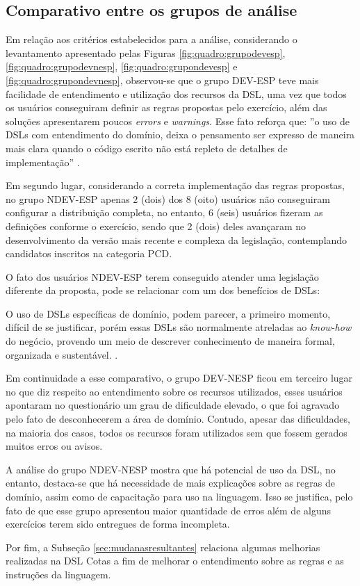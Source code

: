 \subsection{Comparativo entre os grupos de análise}
\label{sec:comparativogrupos}

Em relação aos critérios estabelecidos para a análise, considerando o levantamento apresentado pelas Figuras \ref{fig:quadro:grupodevesp}, \ref{fig:quadro:grupodevnesp}, \ref{fig:quadro:grupondevesp} e \ref{fig:quadro:grupondevnesp}, observou-se que o grupo DEV-ESP teve mais facilidade de entendimento e utilização dos recursos da DSL, uma vez que todos os usuários conseguiram definir as regras propostas pelo exercício, além das soluções apresentarem poucos \textit{errors} e \textit{warnings}. Esse fato reforça que: ''o uso de DSLs com entendimento do domínio, deixa o pensamento ser expresso de maneira mais clara quando o código escrito não está repleto de detalhes de implementação''  \cite[p.41, tradução nossa]{dslengineering}.

Em segundo lugar, considerando a correta implementação das regras propostas, no grupo NDEV-ESP apenas 2 (dois) dos 8 (oito) usuários não conseguiram configurar a distribuição completa, no entanto, 6 (seis) usuários fizeram as definições conforme o exercício, sendo que 2 (dois) deles avançaram no desenvolvimento da versão mais recente e complexa da legislação, contemplando candidatos inscritos na categoria PCD. 

O fato dos usuários NDEV-ESP terem conseguido atender uma legislação diferente da proposta, pode se relacionar com um dos benefícios de DSLs: 

\begin{citacao}
O uso de DSLs específicas de domínio, podem parecer, a primeiro momento, difícil de se justificar, porém essas DSLs são normalmente atreladas ao \textit{know-how} do negócio, provendo um meio de descrever conhecimento de maneira formal, organizada e sustentável. \cite[p.43, tradução nossa]{dslengineering}.
\end{citacao}

Em continuidade a esse comparativo, o grupo DEV-NESP ficou em terceiro lugar no que diz respeito ao entendimento sobre os recursos utilizados, esses usuários apontaram no questionário um grau de dificuldade elevado, o que foi agravado pelo fato de desconhecerem a área de domínio. Contudo, apesar das dificuldades, na maioria dos casos, todos os recursos foram utilizados sem que fossem gerados muitos erros ou avisos. 

A análise do grupo NDEV-NESP mostra que há potencial de uso da DSL, no entanto, destaca-se que há necessidade de mais explicações sobre as regras de domínio, assim como de capacitação para uso na linguagem. Isso se justifica, pelo fato de que esse grupo apresentou maior quantidade de erros além de alguns exercícios terem sido entregues de forma incompleta. 

Por fim, a Subseção \ref{sec:mudanasresultantes} relaciona algumas melhorias realizadas na DSL Cotas a fim de melhorar o entendimento sobre as regras e as instruções da linguagem.
